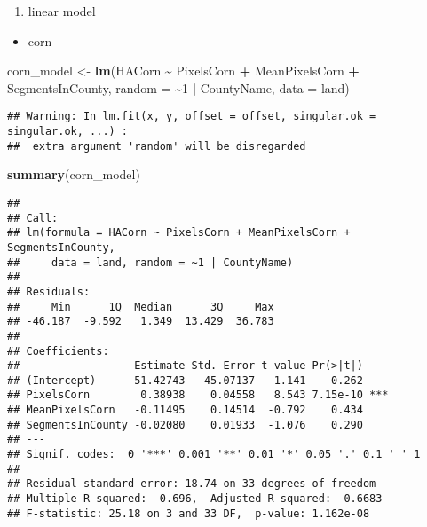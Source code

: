 \documentclass[
]{article}
\newenvironment{Shaded}{\begin{snugshade}}{\end{snugshade}}
\newcommand{\AttributeTok}[1]{\textcolor[rgb]{0.13,0.29,0.53}{#1}}
\newcommand{\DecValTok}[1]{\textcolor[rgb]{0.00,0.00,0.81}{#1}}
\newcommand{\FunctionTok}[1]{\textcolor[rgb]{0.13,0.29,0.53}{\textbf{#1}}}
\newcommand{\NormalTok}[1]{#1}
\newcommand{\OtherTok}[1]{\textcolor[rgb]{0.56,0.35,0.01}{#1}}
\newcommand{\SpecialCharTok}[1]{\textcolor[rgb]{0.81,0.36,0.00}{\textbf{#1}}}
\providecommand{\tightlist}{%
  \setlength{\itemsep}{0pt}\setlength{\parskip}{0pt}}
\begin{document}
\begin{enumerate}
\def\labelenumi{\alph{enumi}.}
\tightlist
\item
  linear model
\end{enumerate}

\begin{itemize}
\tightlist
\item
  corn
\end{itemize}

\begin{Shaded}
\begin{Highlighting}[]
\NormalTok{corn\_model }\OtherTok{\textless{}{-}} \FunctionTok{lm}\NormalTok{(HACorn }\SpecialCharTok{\textasciitilde{}}\NormalTok{ PixelsCorn }\SpecialCharTok{+}\NormalTok{ MeanPixelsCorn }\SpecialCharTok{+}\NormalTok{ SegmentsInCounty, }\AttributeTok{random =} \SpecialCharTok{\textasciitilde{}}\DecValTok{1} \SpecialCharTok{|}\NormalTok{ CountyName, }\AttributeTok{data =}\NormalTok{ land)}
\end{Highlighting}
\end{Shaded}

\begin{verbatim}
## Warning: In lm.fit(x, y, offset = offset, singular.ok = singular.ok, ...) :
##  extra argument 'random' will be disregarded
\end{verbatim}

\begin{Shaded}
\begin{Highlighting}[]
\FunctionTok{summary}\NormalTok{(corn\_model)}
\end{Highlighting}
\end{Shaded}

\begin{verbatim}
## 
## Call:
## lm(formula = HACorn ~ PixelsCorn + MeanPixelsCorn + SegmentsInCounty, 
##     data = land, random = ~1 | CountyName)
## 
## Residuals:
##     Min      1Q  Median      3Q     Max 
## -46.187  -9.592   1.349  13.429  36.783 
## 
## Coefficients:
##                  Estimate Std. Error t value Pr(>|t|)    
## (Intercept)      51.42743   45.07137   1.141    0.262    
## PixelsCorn        0.38938    0.04558   8.543 7.15e-10 ***
## MeanPixelsCorn   -0.11495    0.14514  -0.792    0.434    
## SegmentsInCounty -0.02080    0.01933  -1.076    0.290    
## ---
## Signif. codes:  0 '***' 0.001 '**' 0.01 '*' 0.05 '.' 0.1 ' ' 1
## 
## Residual standard error: 18.74 on 33 degrees of freedom
## Multiple R-squared:  0.696,  Adjusted R-squared:  0.6683 
## F-statistic: 25.18 on 3 and 33 DF,  p-value: 1.162e-08
\end{verbatim}
\end{document}
